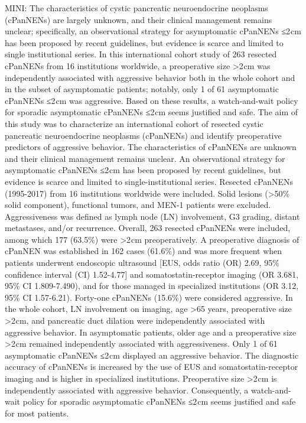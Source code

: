 \documentclass[]{article}
\begin{document}
MINI: The characteristics of cystic pancreatic neuroendocrine neoplasms
(cPanNENs) are largely unknown, and their clinical management remains
unclear; specifically, an observational strategy for asymptomatic
cPanNENs ≤2 cm has been proposed by recent guidelines, but evidence is
scarce and limited to single institutional series. In this international
cohort study of 263 resected cPanNENs from 16 institutions worldwide, a
preoperative size \textgreater{}2 cm was independently associated with
aggressive behavior both in the whole cohort and in the subset of
asymptomatic patients; notably, only 1 of 61 asymptomatic cPanNENs ≤2 cm
was aggressive. Based on these results, a watch-and-wait policy for
sporadic asymptomatic cPanNENs ≤2 cm seems justified and safe. The aim
of this study was to characterize an international cohort of resected
cystic pancreatic neuroendocrine neoplasms (cPanNENs) and identify
preoperative predictors of aggressive behavior. The characteristics of
cPanNENs are unknown and their clinical management remains unclear. An
observational strategy for asymptomatic cPanNENs ≤2 cm has been proposed
by recent guidelines, but evidence is scarce and limited to
single-institutional series. Resected cPanNENs (1995-2017) from 16
institutions worldwide were included. Solid lesions (\textgreater{}50\%
solid component), functional tumors, and MEN-1 patients were excluded.
Aggressiveness was defined as lymph node (LN) involvement, G3 grading,
distant metastases, and/or recurrence. Overall, 263 resected cPanNENs
were included, among which 177 (63.5\%) were \textgreater{}2 cm
preoperatively. A preoperative diagnosis of cPanNEN was established in
162 cases (61.6\%) and was more frequent when patients underwent
endoscopic ultrasound {[}EUS, odds ratio (OR) 2.69, 95\% confidence
interval (CI) 1.52-4.77{]} and somatostatin-receptor imaging (OR 3.681,
95\% CI 1.809-7.490), and for those managed in specialized institutions
(OR 3.12, 95\% CI 1.57-6.21). Forty-one cPanNENs (15.6\%) were
considered aggressive. In the whole cohort, LN involvement on imaging,
age \textgreater{}65 years, preoperative size \textgreater{}2 cm, and
pancreatic duct dilation were independently associated with aggressive
behavior. In asymptomatic patients, older age and a preoperative size
\textgreater{}2 cm remained independently associated with
aggressiveness. Only 1 of 61 asymptomatic cPanNENs ≤2 cm displayed an
aggressive behavior. The diagnostic accuracy of cPanNENs is increased by
the use of EUS and somatostatin-receptor imaging and is higher in
specialized institutions. Preoperative size \textgreater{}2 cm is
independently associated with aggressive behavior. Consequently, a
watch-and-wait policy for sporadic asymptomatic cPanNENs ≤2 cm seems
justified and safe for most patients.
\end{document}
